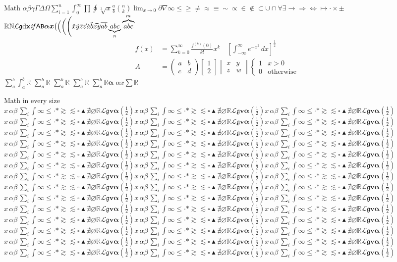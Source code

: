 \documentclass{nicrainha}
\begin{document}
\begin{slide}{Math}
  $\alpha\beta\gamma\Gamma\Delta\Omega \sum_{i=1}^n \int_0^\infty \prod \oint
  \sqrt[3]{x} \frac{a}{b} \binom{n}{k} \lim_{x\to0} \partial \nabla \infty
  \leq \geq \neq \approx \equiv \sim \propto \in \notin \subset \cup \cap
  \forall \exists \to \Rightarrow \Leftrightarrow \mapsto \cdot \times \pm$
  $\mathbb{R}\mathbb{N}\mathcal{L}\mathfrak{g}\mathrm{d}\mathbf{x}\mathit{if}
  \mathsf{A}\mathtt{B}\boldsymbol{\alpha}\boldsymbol{x}\bigl(\Bigl(\biggl(\Biggl(
  \hat{x}\tilde{y}\bar{z}\vec{v}\dot{a}\ddot{b}\widehat{xy}\overline{ab}
  \underbrace{abc}_{n}\overbrace{abc}^{m}$
  \begin{align}
    f(x) &= \sum_{k=0}^{\infty} \frac{f^{(k)}(0)}{k!} x^k
      \quad \left[ \int_{-\infty}^{\infty} e^{-x^2}\,dx \right]^{\frac{1}{2}} \\
    A &= \begin{pmatrix} a & b \\ c & d \end{pmatrix}
      \begin{bmatrix} 1 \\ 2 \end{bmatrix}
      \begin{vmatrix} x & y \\ z & w \end{vmatrix}
      \begin{cases} 1 & x > 0 \\ 0 & \text{otherwise} \end{cases}
  \end{align}
  {\small $\sum_a^b \int_a^b \mathbb{R}$} {\footnotesize $\sum_a^b \mathbb{R}$}
  {\tiny $\sum_a^b \mathbb{R}$} {\Large $\sum_a^b \mathbb{R}$}
  {\Huge $\sum_a^b \mathbb{R} \boldsymbol{\alpha}$}
  \textbf{\boldmath $\alpha x \sum \mathbb{R}$}
\end{slide}

\begin{slide}{Math in every size}
  \newcommand\symbols{x\, \alpha\beta\, \sum_i \int \infty \le \cdot \ast
    \gtrsim \lesssim \square \blacktriangle \nexists \varnothing
    \mathbb{R}\mathcal{L}\mathfrak{g}\mathbf{v} \boldsymbol{\alpha} \left(\tfrac{1}{2}\right)}
  \newcommand\sample{$\symbols \scriptstyle\symbols \scriptscriptstyle\symbols$}
  {\tiny\sample} {\scriptsize\sample} {\footnotesize\sample} {\small\sample}
  {\normalsize\sample} {\large\sample} {\Large\sample} {\LARGE\sample}
  {\huge\sample} {\Huge\sample}
  {\tiny\bfseries\boldmath\sample} {\scriptsize\boldmath\sample}
  {\small\boldmath\sample} {\Large\boldmath\sample}
\end{slide}
\end{document}
